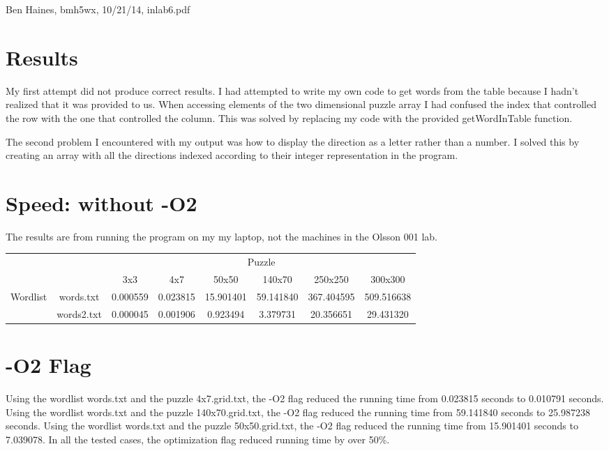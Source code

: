 \documentclass{article} %
\begin{document}
Ben Haines, bmh5wx, 10/21/14, inlab6.pdf
\section{Results}
My first attempt did not produce correct results. I had attempted to write my own code to get words from the table because I hadn't realized that it was provided to us. When accessing elements of the two dimensional puzzle array I had confused the index that controlled the row with the one that controlled the column. This was solved by replacing my code with the provided getWordInTable function.

The second problem I encountered with my output was how to display the direction as a letter rather than a number. I solved this by creating an array with all the directions indexed according to their integer representation in the program.

\section{Speed: without -O2}
The results are from running the program on my my laptop, not the machines in the Olsson 001 lab.
\begin{table}[h]
\begin{tabular}{cc|c|c|c|c|c|c|}
\cline{3-8}
                                                &            & \multicolumn{6}{c|}{Puzzle}                                           \\ \cline{3-8} 
                                                &            & 3x3      & 4x7      & 50x50     & 140x70    & 250x250    & 300x300    \\ \hline
\multicolumn{1}{|c|}{\multirow{2}{*}{Wordlist}} & words.txt  & 0.000559 & 0.023815 & 15.901401 & 59.141840 & 367.404595 & 509.516638 \\ \cline{2-8} 
\multicolumn{1}{|c|}{}                          & words2.txt & 0.000045 & 0.001906 & 0.923494  & 3.379731  & 20.356651  & 29.431320  \\ \hline
\end{tabular}
\end{table}

\section{-O2 Flag}
Using the wordlist words.txt and the puzzle 4x7.grid.txt, the -O2 flag reduced the running time from 0.023815 seconds to 0.010791 seconds. 
Using the wordlist words.txt and the puzzle 140x70.grid.txt, the -O2 flag reduced the running time from 59.141840 seconds to 25.987238 seconds. 
Using the wordlist words.txt and the puzzle 50x50.grid.txt, the -O2 flag reduced the running time from 15.901401 seconds to 7.039078.
In all the tested cases, the optimization flag reduced running time by over 50\%.
\end{document}
